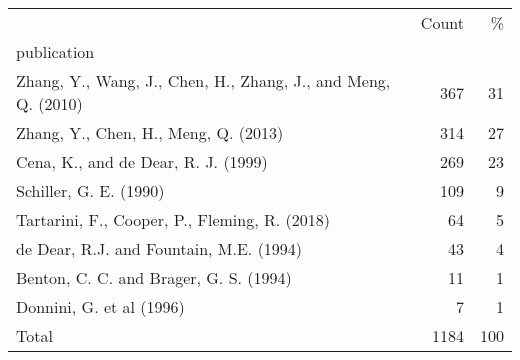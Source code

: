 \begin{tabular}{lrr}
\toprule
 & Count & \% \\
publication &  &  \\
\midrule
Zhang, Y., Wang, J., Chen, H., Zhang, J., and Meng, Q. (2010) & 367 & 31 \\
Zhang, Y., Chen, H., Meng, Q. (2013) & 314 & 27 \\
Cena, K., and de Dear, R. J. (1999) & 269 & 23 \\
Schiller, G. E. (1990) & 109 & 9 \\
Tartarini, F., Cooper, P., Fleming, R. (2018) & 64 & 5 \\
de Dear, R.J. and Fountain, M.E. (1994) & 43 & 4 \\
Benton, C. C. and Brager, G. S. (1994) & 11 & 1 \\
Donnini, G. et al (1996) & 7 & 1 \\
Total & 1184 & 100 \\
\bottomrule
\end{tabular}
